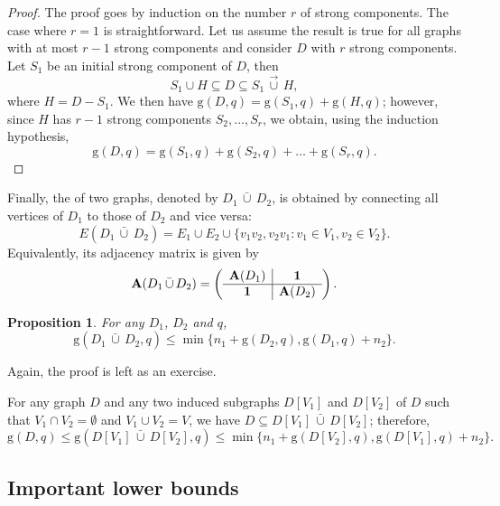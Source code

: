 \documentclass[a4paper, 11pt]{book}
\numberwithin{equation}{section}
\theoremstyle{plain}
\newtheorem{proposition}[equation]	{Proposition}
\newcommand{\vcup}{\,\vec{\cup}\,}
\newcommand{\bcup}{\,\bar{\cup}\,}
\newcommand{\adjacency}{{\bf A}}
\newcommand{\guessing}{\mathrm{g}}
\renewcommand{\(}{\ldbrack}
\renewcommand{\)}{\rdbrack}
\newcommand{\BF}[1]{{\bf\boldmath{#1}\unboldmath}}
\begin{document}
\begin{proof}
The proof goes by induction on the number $r$ of strong components. The case where $r=1$ is straightforward. Let us assume the result is true for all graphs with at most $r-1$ strong components and consider $D$ with $r$ strong components. Let $S_1$ be an initial strong component of $D$, then 
\[
	S_1 \cup H \subseteq D \subseteq S_1 \vcup H,
\]
where $H = D - S_1$. We then have $\guessing(D,q) = \guessing(S_1, q) + \guessing(H, q)$; however, since $H$ has $r-1$ strong components $S_2, \dots, S_r$, we obtain, using the induction hypothesis, 
\[
\guessing(D,q) = \guessing(S_1, q) + \guessing(S_2, q) + \dots + \guessing(S_r, q).
\]
\end{proof}


Finally, the \BF{bidirectional union} of two graphs, denoted by $D_1 \bcup D_2$, is obtained by connecting all vertices of $D_1$ to those of $D_2$ and vice versa: 
\[
	E(D_1 \bcup D_2) = E_1 \cup E_2 \cup \{v_1v_2, v_2v_1: v_1 \in V_1, v_2 \in V_2\}.
\]
Equivalently, its adjacency matrix is given by
\begin{equation} \nonumber
	\adjacency(D_1 \bcup D_2) = \left(\begin{array}{c|c}
	\adjacency(D_1) & {\bf 1}\\
	\hline
	{\bf 1} & \adjacency(D_2)
	\end{array}\right).
\end{equation}

\begin{proposition} \label{prop:guessing_bidirectional_union}
For any $D_1$, $D_2$ and $q$,
\[
	\guessing(D_1 \bcup D_2, q) \le \min\{n_1 + \guessing(D_2, q), \guessing(D_1, q) + n_2 \}.
\]
\end{proposition}
Again, the proof is left as an exercise.

For any graph $D$ and any two induced subgraphs $D[V_1]$ and $D[V_2]$ of $D$ such that $V_1 \cap V_2 = \emptyset$ and $V_1 \cup V_2 = V$, we have $D \subseteq D[V_1] \bcup D[V_2]$; therefore,
\[
	\guessing(D,q) \le \guessing(D[V_1] \bcup D[V_2], q) \le \min\{n_1 + \guessing(D[V_2], q), \guessing(D[V_1], q) + n_2 \}.
\]









\subsection{Important lower bounds} \label{sec:guessing_lower_bounds}
\end{document}
